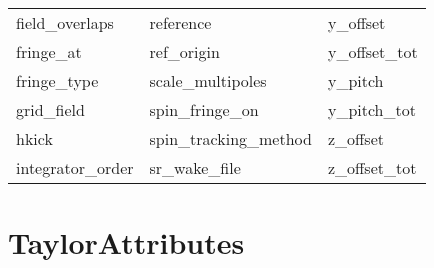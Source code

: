 \begin{tabular}{lll}
field_overlaps              & reference                   & y_offset                    \\
fringe_at                   & ref_origin                  & y_offset_tot                \\
fringe_type                 & scale_multipoles            & y_pitch                     \\
grid_field                  & spin_fringe_on              & y_pitch_tot                 \\
hkick                       & spin_tracking_method        & z_offset                    \\
integrator_order            & sr_wake_file                & z_offset_tot                \\
 \bottomrule
 \end{tabular}
 \vfill
 
 \section{TaylorAttributes}
 \label{s:list.taylor}
 
